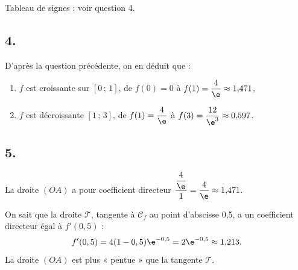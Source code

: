 Tableau de signes : voir question 4.

\subsection*{4.}

D'après la question précédente, on en déduit que :
\begin{enumerate}[label=-]
    \item \( f \) est croissante sur \( [0 \,;\, 1] \), de \( f(0) = 0 \) à \( f(1) = \dfrac{4}{\e} \approx 1{,}471 \),
    \item \( f \) est décroissante \( [1 \,;\, 3] \), de \( f(1) = \dfrac{4}{\e} \) à \( f(3) = \dfrac{12}{\e^3} \approx 0{,}597 \).
\end{enumerate}

\begin{center}
\end{center}

\subsection*{5.}

La droite \((OA)\) a pour coefficient directeur \( \dfrac{\dfrac{4}{\e}}{1} = \dfrac{4}{\e} \approx 1{,}471 \).

On sait que la droite \(\mathcal{T}\), tangente à \(\mathcal{C}_f\) au point d'abscisse 0,5, a un coefficient directeur égal à \( f'(0,5) \) :
\[
f'(0,5) = 4(1 - 0,5)\e^{-0,5} = 2\e^{-0,5} \approx 1{,}213.
\]
La droite \((OA)\) est plus « pentue » que la tangente \( \mathcal{T} \).
